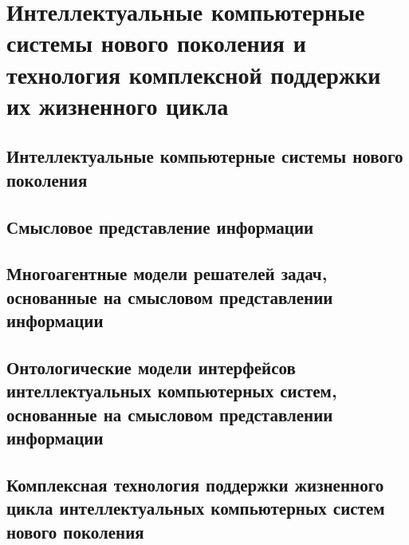 \chapter{Интеллектуальные компьютерные системы нового поколения и технология комплексной поддержки их жизненного цикла}
\label{chapter_new_generation_systems} 


\section{Интеллектуальные компьютерные системы нового поколения}
\section{Смысловое представление информации}
\section{Многоагентные модели решателей задач, основанные на смысловом представлении информации}
\section{Онтологические модели интерфейсов интеллектуальных компьютерных систем, основанные на смысловом представлении информации}
\section{Комплексная технология поддержки жизненного цикла интеллектуальных компьютерных систем нового поколения}

%